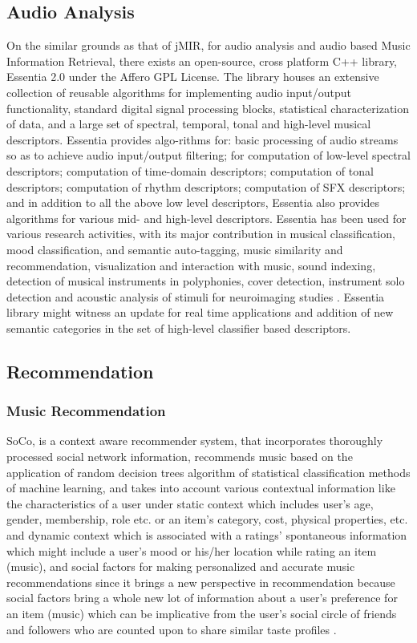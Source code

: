 \documentclass{proc}
\begin{document}
\subsection{Audio Analysis}
On the similar grounds as that of jMIR, for audio analysis and audio based Music Information Retrieval, there exists an open-source, cross platform C++ library, Essentia 2.0 under the Affero GPL License. The library houses an extensive collection of reusable algorithms for implementing audio input/output functionality, standard digital signal processing blocks, statistical characterization of data, and a large set of spectral, temporal, tonal and high-level musical descriptors. Essentia provides algo-rithms for: basic processing of audio streams so as to achieve audio input/output filtering; for computation of low-level spectral descriptors; computation of time-domain descriptors; computation of tonal descriptors; computation of rhythm descriptors; computation of SFX descriptors; and in addition to all the above low level descriptors, Essentia also provides algorithms for various mid- and high-level descriptors. Essentia has been used for various research activities, with its major contribution in musical classification, mood classification, and semantic auto-tagging, music similarity and recommendation, visualization and interaction with music, sound indexing, detection of musical instruments in polyphonies, cover detection, instrument solo detection and acoustic analysis of stimuli for neuroimaging studies \cite{Bogdanov2013}. Essentia library might witness an update for real time applications and addition of new semantic categories in the set of high-level classifier based descriptors. 
\subsection{Recommendation}
\subsubsection{Music Recommendation}
SoCo, is a context aware recommender system, that incorporates thoroughly processed social network information, recommends music based on the application of random decision trees algorithm of statistical classification methods of machine learning, and takes into account various contextual information like the characteristics of a user under static context which includes user’s age, gender, membership, role etc. or an item’s category, cost, physical properties, etc. and dynamic context which is associated with a ratings’ spontaneous information which might include a user’s mood or his/her location while rating an item (music), and social factors for making personalized and accurate music recommendations since it brings a new perspective in recommendation because social factors bring a whole new lot of information about a user’s preference for an item (music) which can be implicative from the user’s social circle of friends and followers who are counted upon to share similar taste profiles \cite{Federale}. 
\end{document}

